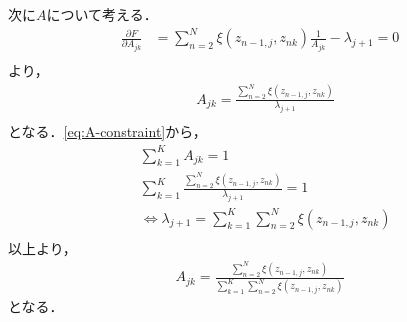 次に$A$について考える．
\begin{align}
  \frac{\partial F}{\partial A_{jk}} &= \sum_{n=2}^N\xi(z_{n-1,j},z_{nk})\frac{1}{A_{jk}} - \lambda_{j+1} = 0 \\
\end{align}
より，
\begin{align}
  &A_{jk} = \frac{\sum_{n=2}^N\xi(z_{n-1,j},z_{nk})}{\lambda_{j+1}}  \\
\end{align}
となる．\eqref{eq:A-constraint}から，
\begin{align}
  &\sum_{k=1}^KA_{jk} = 1 \\
  &\sum_{k=1}^K\frac{\sum_{n=2}^N\xi(z_{n-1,j},z_{nk})}{\lambda_{j+1}} = 1 \\
  &\Leftrightarrow \lambda_{j+1} = \sum_{k=1}^K\sum_{n=2}^N\xi(z_{n-1,j},z_{nk}) \\
\end{align}
以上より，
\begin{align}
  A_{jk} = \frac{\sum_{n=2}^N\xi(z_{n-1,j},z_{nk})}{\sum_{k=1}^K\sum_{n=2}^N\xi(z_{n-1,j},z_{nk})} \label{eq:A-max}
\end{align}
となる．

